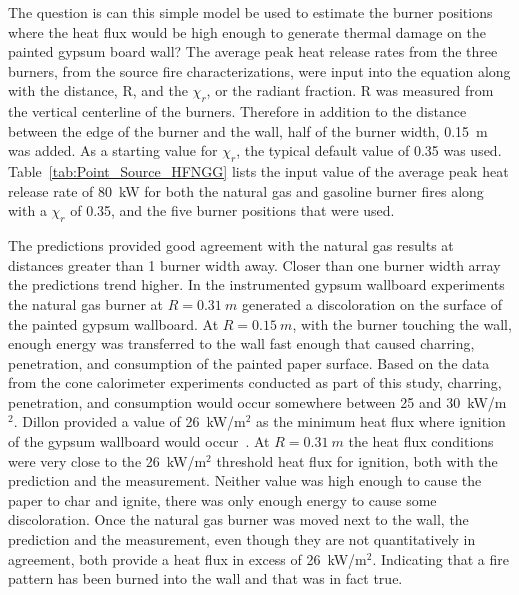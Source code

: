 \documentclass[twoside]{uocthesis}
\begin{document}
{The question is can this simple model be used to estimate the burner positions where the heat flux would be high enough to generate thermal damage on the painted gypsum board wall?  The average peak heat release rates from the three burners, from the source fire characterizations, were input into the equation along with the distance, R, and the $\chi_r$, or the radiant fraction.  R was measured from the vertical centerline of the burners.  Therefore in addition to the distance between the edge of the burner and the wall, half of the burner width, 0.15~m was added.  As a starting value for $\chi_r$, the typical default value of 0.35 was used.  Table~\ref{tab:Point_Source_HFNGG} lists the input value of the average peak heat release rate of 80~kW for both the natural gas and gasoline burner fires along with a $\chi_r$ of 0.35, and the five burner positions that were used.  

The predictions provided good agreement with the natural gas results at distances greater than 1 burner width away.  Closer than one burner width array the predictions trend higher.  In the instrumented gypsum wallboard experiments the natural gas burner at $R=0.31~m$ generated a discoloration on the surface of the painted gypsum wallboard.  At $R=0.15~m$, with the burner touching the wall, enough energy was transferred to the wall fast enough that caused charring, penetration, and consumption of the painted paper surface.  Based on the data from the cone calorimeter experiments conducted as part of this study, charring, penetration, and consumption would occur somewhere between 25 and 30~kW/m$^2$.  Dillon provided a value of 26~kW/m$^2$ as the minimum heat flux where ignition of the gypsum wallboard would occur~\cite{Dillon:1998}.  At $R=0.31~m$ the heat flux conditions were very close to the 26~kW/m$^2$ threshold heat flux for ignition, both with the prediction and the measurement.  Neither value was high enough to cause the paper to char and ignite, there was only enough energy to cause some discoloration.  Once the natural gas burner was moved next to the wall, the prediction and the measurement, even though they are not quantitatively in agreement, both provide a heat flux in excess of 26~kW/m$^2$.  Indicating that a fire pattern has been burned into the wall and that was in fact true.  

}
\end{document}
